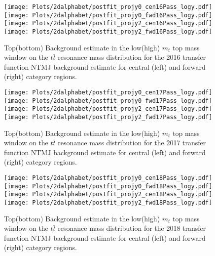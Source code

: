 \begin{figure}[!htbp]
	\begin{center}
		\texttt{[image: Plots/2dalphabet/postfit\_projy0\_cen16Pass\_logy.pdf]}
		\texttt{[image: Plots/2dalphabet/postfit\_projy0\_fwd16Pass\_logy.pdf]}\\
		\texttt{[image: Plots/2dalphabet/postfit\_projy2\_cen16Pass\_logy.pdf]}
		\texttt{[image: Plots/2dalphabet/postfit\_projy2\_fwd16Pass\_logy.pdf]}\\

		\caption{Top(bottom) Background estimate in the low(high) $m_{t}$ top mass window on the $t\bar{t}$ resonance mass distribution for the 2016 transfer function NTMJ background estimate for central (left) and forward (right) category regions.}
		\label{fig:closure_2016}
	\end{center}
\end{figure}


\begin{figure}[!htbp]
	\begin{center}
		\texttt{[image: Plots/2dalphabet/postfit\_projy0\_cen17Pass\_logy.pdf]}
		\texttt{[image: Plots/2dalphabet/postfit\_projy0\_fwd17Pass\_logy.pdf]}\\
		\texttt{[image: Plots/2dalphabet/postfit\_projy2\_cen17Pass\_logy.pdf]}
		\texttt{[image: Plots/2dalphabet/postfit\_projy2\_fwd17Pass\_logy.pdf]}\\
		
		\caption{Top(bottom) Background estimate in the low(high) $m_{t}$ top mass window on the $t\bar{t}$ resonance mass distribution for the 2017 transfer function NTMJ background estimate for central (left) and forward (right) category regions.}
		\label{fig:closure_2017}
	\end{center}
\end{figure}


\begin{figure}[!htbp]
	\begin{center}
		\texttt{[image: Plots/2dalphabet/postfit\_projy0\_cen18Pass\_logy.pdf]}
		\texttt{[image: Plots/2dalphabet/postfit\_projy0\_fwd18Pass\_logy.pdf]}\\
		\texttt{[image: Plots/2dalphabet/postfit\_projy2\_cen18Pass\_logy.pdf]}
		\texttt{[image: Plots/2dalphabet/postfit\_projy2\_fwd18Pass\_logy.pdf]}\\
		
		\caption{Top(bottom) Background estimate in the low(high) $m_{t}$ top mass window on the $t\bar{t}$ resonance mass distribution for the 2018 transfer function NTMJ background estimate for central (left) and forward (right) category regions.}
		\label{fig:closure_2018}
	\end{center}
\end{figure}







